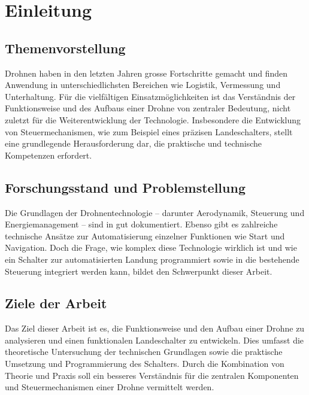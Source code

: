 \chapter{Einleitung}
\section{Themenvorstellung}
Drohnen haben in den letzten Jahren grosse Fortschritte gemacht und finden Anwendung in unterschiedlichsten Bereichen wie Logistik, Vermessung und Unterhaltung. Für die vielfältigen Einsatzmöglichkeiten ist das Verständnis der Funktionsweise und des Aufbaus einer Drohne von zentraler Bedeutung, nicht zuletzt für die Weiterentwicklung der Technologie. Insbesondere die Entwicklung von Steuermechanismen, wie zum Beispiel eines präzisen Landeschalters, stellt eine grundlegende Herausforderung dar, die praktische und technische Kompetenzen erfordert.
	
\section{Forschungsstand und Problemstellung}
Die Grundlagen der Drohnentechnologie – darunter Aerodynamik, Steuerung und Energiemanagement – sind in gut dokumentiert. Ebenso gibt es zahlreiche technische Ansätze zur Automatisierung einzelner Funktionen wie Start und Navigation. Doch die Frage, wie komplex diese Technologie wirklich ist und wie ein Schalter zur automatisierten Landung programmiert sowie in die bestehende Steuerung integriert werden kann, bildet den Schwerpunkt dieser Arbeit.
	
\section{Ziele der Arbeit}
Das Ziel dieser Arbeit ist es, die Funktionsweise und den Aufbau einer Drohne zu analysieren und einen funktionalen Landeschalter zu entwickeln. Dies umfasst die theoretische Untersuchung der technischen Grundlagen sowie die praktische Umsetzung und Programmierung des Schalters. Durch die Kombination von Theorie und Praxis soll ein besseres Verständnis für die zentralen Komponenten und Steuermechanismen einer Drohne vermittelt werden.

